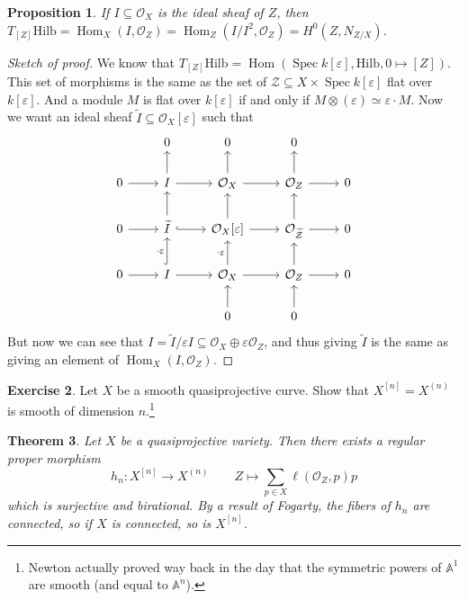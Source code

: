 \documentclass[leqno, openany]{memoir}
\newtheorem{thm}{Theorem}[section]
\newtheorem{prop}[thm]{Proposition}
\theoremstyle{definition}
\newtheorem{exer}[thm]{Exercise}
\theoremstyle{remark}
\theoremstyle{plain}
\theoremstyle{definition}
\theoremstyle{remark}
\newcommand{\A}{\mathbb{A}}
\newcommand{\ep}{\varepsilon}
\newcommand{\mc}[1]{\mathcal{#1}}
\newcommand{\mr}[1]{\mathrm{#1}}
\newcommand{\wt}[1]{\widetilde{#1}}
\DeclareMathOperator{\Hom}{Hom}
\DeclareMathOperator{\Spec}{Spec}
\begin{document}
\begin{prop}
    If $I \subseteq \mc{O}_X$ is the ideal sheaf of $Z$, then $T_{[Z]} \mr{Hilb} = \Hom_X(I, \mc{O}_Z) = \Hom_Z(I/I^2, \mc{O}_Z) = H^0(Z, N_{Z/X})$.
\end{prop}

\begin{proof}[Sketch of proof]
    We know that $T_{[Z]} \mr{Hilb} = \Hom(\Spec k[\ep], \mr{Hilb}, 0 \mapsto [Z])$. This set of morphisms is the same as the set of $\mc{Z} \subseteq X \times \Spec k[\ep]$ flat over $k[\ep]$. And a module $M$ is flat over $k[\ep]$ if and only if $M \otimes (\ep) \simeq \ep \cdot M$. Now we want an ideal sheaf $\wt{I} \subseteq \mc{O}_X[\ep]$ such that
    \begin{equation*}
    \begin{tikzcd}
        & 0 & 0 & 0 \\
        0 \ar{r} & I \ar{r} \ar{u} & \mc{O}_X \ar{u} \ar{r} & \mc{O}_Z \ar{r} \ar{u} & 0 \\
        0 \ar{r} & \wt{I} \ar{u} \ar[hookrightarrow]{r} & \mc{O}_X[\ep] \ar{r} \ar{u} & \mc{O}_{\wt{\mc{Z}}} \ar{r} \ar{u} & 0 \\
        0 \ar{r} & I \ar{r} \ar[hookrightarrow]{u}{\cdot \ep} & \mc{O}_X \ar{u}{\cdot \ep} \ar{r} & \mc{O}_Z \ar{r} \ar{u} & 0 \\
        & & 0 \ar{u} & 0 \ar{u}
    \end{tikzcd}
    \end{equation*}
    But now we can see that $I = \wt{I}/\ep I \subseteq \mc{O}_X \oplus \ep \mc{O}_Z$, and thus giving $\wt{I}$ is the same as giving an element of $\Hom_X(I, \mc{O}_Z)$.
\end{proof}

\begin{exer}
    Let $X$ be a smooth quasiprojective curve. Show that $X^{[n]} = X^{(n)}$ is smooth of dimension $n$.\footnote{Newton actually proved way back in the day that the symmetric powers of $\A^1$ are smooth (and equal to $\A^n$).}
\end{exer}

\begin{thm}
    Let $X$ be a quasiprojective variety. Then there exists a regular proper morphism 
    \[ h_n \colon X^{[n]} \to X^{(n)} \qquad Z \mapsto \sum_{p \in X} \ell(\mc{O}_Z, p) p \]
    which is surjective and birational. By a result of Fogarty, the fibers of $h_n$ are connected, so if $X$ is connected, so is $X^{[n]}$.
\end{thm}
\end{document}
